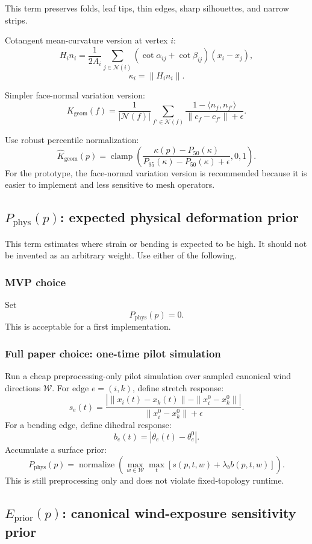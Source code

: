 \documentclass[11pt,a4paper]{article}
\newcommand{\clamp}{\operatorname{clamp}}
\newcommand{\normalize}{\operatorname{normalize}}
\begin{document}
This term preserves folds, leaf tips, thin edges, sharp silhouettes, and narrow strips.

Cotangent mean-curvature version at vertex $i$:
\[
H_i n_i=\frac{1}{2A_i}\sum_{j\in\mathcal{N}(i)}
(\cot\alpha_{ij}+\cot\beta_{ij})(x_i-x_j),
\]
\[
\kappa_i=\|H_i n_i\|.
\]

Simpler face-normal variation version:
\[
K_{\mathrm{geom}}(f)=
\frac{1}{|\mathcal{N}(f)|}
\sum_{f'\in\mathcal{N}(f)}
\frac{1-\langle n_f,n_{f'}\rangle}{\|c_f-c_{f'}\|+\epsilon}.
\]

Use robust percentile normalization:
\[
\widehat{K}_{\mathrm{geom}}(p)=
\clamp\left(
\frac{\kappa(p)-P_{50}(\kappa)}{P_{95}(\kappa)-P_{50}(\kappa)+\epsilon},0,1
\right).
\]
For the prototype, the face-normal variation version is recommended because it is easier to implement and less sensitive to mesh operators.

\subsection{$P_{\mathrm{phys}}(p)$: expected physical deformation prior}

This term estimates where strain or bending is expected to be high. It should not be invented as an arbitrary weight. Use either of the following.

\subsubsection{MVP choice}

Set
\[
P_{\mathrm{phys}}(p)=0.
\]
This is acceptable for a first implementation.

\subsubsection{Full paper choice: one-time pilot simulation}

Run a cheap preprocessing-only pilot simulation over sampled canonical wind directions $\mathcal{W}$. For edge $e=(i,k)$, define stretch response:
\[
s_e(t)=\frac{\left|\|x_i(t)-x_k(t)\|-\|x_i^0-x_k^0\|\right|}{\|x_i^0-x_k^0\|+\epsilon}.
\]
For a bending edge, define dihedral response:
\[
b_e(t)=|\theta_e(t)-\theta_e^0|.
\]
Accumulate a surface prior:
\[
P_{\mathrm{phys}}(p)=
\normalize\left(
\max_{w\in\mathcal{W}}\max_t
\left[s(p,t,w)+\lambda_b b(p,t,w)\right]
\right).
\]
This is still preprocessing only and does not violate fixed-topology runtime.

\subsection{$E_{\mathrm{prior}}(p)$: canonical wind-exposure sensitivity prior}
\end{document}

